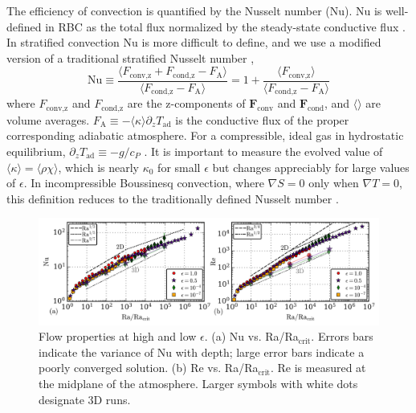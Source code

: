 \documentclass[aps, prfluids, onecolumn, notitlepage, nofootinbib, groupedaddress, amsfonts, amssymb, amsmath]{revtex4-1}
\newcommand{\grad}{\ensuremath{\nabla}}
\begin{document}
The efficiency of convection is quantified by the Nusselt number (Nu).  
Nu is well-defined in RBC
as the total flux normalized by the steady-state conductive flux 
\cite{johnston&doering2009, otero&all2002}.
In stratified convection Nu is more difficult to define, and we use
a modified version of a traditional stratified Nusselt number 
\cite{graham1975,hurlburt&all1984},
\begin{equation}
\text{Nu} \equiv \frac{\langle F_{\text{conv,z}} + F_{\text{cond,z}} - F_{\text{A}}\rangle}
{\langle F_{\text{cond,z}} - F_{\text{A}}\rangle} 
= 1 + \frac{\langle F_{\text{conv,z}}\rangle}{\langle F_{\text{cond,z}} - F_{\text{A}} \rangle}
\label{eqn:nusselt}
\end{equation}
where $F_{\text{conv,z}}$ and $F_{\text{cond,z}}$ are the 
z-components of $\bm{F}_{\text{conv}}$ and $\bm{F}_{\text{cond}}$,
and $\langle \rangle$ are volume averages.  
$F_{\text{A}} \equiv -\langle\kappa\rangle \partial_z T_{\text{ad}}$ 
is the conductive flux of the proper corresponding adiabatic atmosphere.
For a compressible, ideal gas in hydrostatic equilibrium,
$\partial_z T_{\text{ad}} \equiv - g / c_{P}$ \cite{spiegel&veronis1960}.  
It is important to measure the evolved value of
$\langle \kappa \rangle = \langle \rho\chi \rangle$, which is nearly
$\kappa_0$ for small $\epsilon$ but changes appreciably for large
values of $\epsilon$.
In incompressible Boussinesq convection, where $\grad S = 0$ only when 
$\grad T = 0$, this definition reduces to the traditionally defined
Nusselt number \cite{otero&all2002, johnston&doering2009}.
\begin{figure}[t!]
\includegraphics[width=\textwidth]{./figs/re_and_nu_v_Ra.png}
\caption{
Flow properties at high and low $\epsilon$. 
(a) Nu vs. Ra/Ra$_{\text{crit}}$.
Errors bars indicate the variance of Nu with depth;
large error bars indicate a poorly converged solution.
(b) Re vs. Ra/Ra$_{\text{crit}}$.
Re is measured at the midplane of the atmosphere.
Larger symbols with white dots designate 3D runs.
 \label{fig:re_and_nu_v_ra}
}
\end{figure}
\end{document}
